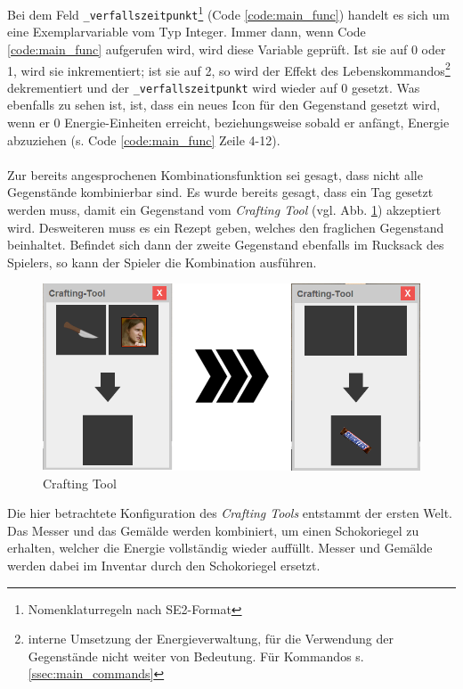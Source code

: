 \documentclass[12pt,twoside]{article}
\theoremstyle{plain}
\theoremstyle{definition}
\theoremstyle{remark}
\begin{document}
Bei dem Feld \texttt{\_verfallszeitpunkt}\footnote{Nomenklaturregeln nach SE2-Format} (Code \ref{code:main_func}) handelt es sich um eine Exemplarvariable vom Typ Integer.
Immer dann, wenn Code \ref{code:main_func} aufgerufen wird, wird diese Variable geprüft.
Ist sie auf 0 oder 1, wird sie inkrementiert; ist sie auf 2, so wird der Effekt des Lebenskommandos\footnote{interne Umsetzung der Energieverwaltung, für die Verwendung der Gegenstände nicht weiter von Bedeutung. Für Kommandos s. \ref{ssec:main_commands}} dekrementiert und der \texttt{\_verfallszeitpunkt} wird wieder auf 0 gesetzt.
Was ebenfalls zu sehen ist, ist, dass ein neues Icon für den Gegenstand gesetzt wird, wenn er 0 Energie-Einheiten erreicht, beziehungsweise sobald er anfängt, Energie abzuziehen (s. Code \ref{code:main_func} Zeile 4-12).\\
\\
Zur bereits angesprochenen Kombinationsfunktion sei gesagt, dass nicht alle Gegenstände kombinierbar sind.
Es wurde bereits gesagt, dass ein Tag gesetzt werden muss, damit ein Gegenstand vom \textit{Crafting Tool} (vgl. Abb. \ref{fig:main_craft}) akzeptiert wird.
Desweiteren muss es ein Rezept geben, welches den fraglichen Gegenstand beinhaltet.
Befindet sich dann der zweite Gegenstand ebenfalls im Rucksack des Spielers, so kann der Spieler die Kombination ausführen.\\
\begin{figure}[h!bt]
    \begin{center}
        \includegraphics[scale=0.5]{craftingUI.png}
    	\caption{Crafting Tool}
        \label{fig:main_craft}
    \end{center}
\end{figure}
Die hier betrachtete Konfiguration des \textit{Crafting Tools} entstammt der ersten Welt.
Das Messer und das Gemälde werden kombiniert, um einen Schokoriegel zu erhalten, welcher die Energie vollständig wieder auffüllt.
Messer und Gemälde werden dabei im Inventar durch den Schokoriegel ersetzt.
\end{document}
